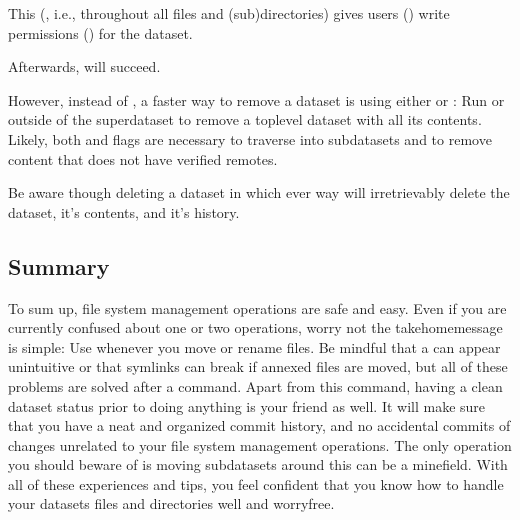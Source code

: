 \sphinxAtStartPar
This  (, i.e., throughout all files and (sub)directories) gives users
() write permissions () for the dataset.

\sphinxAtStartPar
Afterwards,  will succeed.

\sphinxAtStartPar
However, instead of , a faster way to remove a dataset is using either  or  : Run  or  outside of the
superdataset to remove a top\sphinxhyphen{}level dataset with all its contents. Likely,
both   and  flags are necessary
to traverse into subdatasets and to remove content that does not have verified remotes.

\sphinxAtStartPar
Be aware though deleting a dataset in which ever way will
irretrievably delete the dataset, it’s contents, and it’s history.


\subsection{Summary}
\label{\detokenize{basics/101-136-filesystem:summary}}
\sphinxAtStartPar
To sum up, file system management operations are safe and easy.
Even if you are currently confused about one or two operations,
worry not \textendash{} the take\sphinxhyphen{}home\sphinxhyphen{}message is simple: Use 
whenever you move or rename files. Be mindful that a 
can appear unintuitive or that symlinks can break if annexed files are moved,
but all of these problems are solved after a  command.
Apart from this command, having a clean dataset status prior to doing anything
is your friend as well. It will make sure that you have a neat and organized
commit history, and no accidental commits of changes unrelated to your file
system management operations. The only operation you should beware of is
moving subdatasets around \textendash{} this can be a minefield.
With all of these experiences and tips, you feel confident that you know
how to handle your datasets files and directories well and worry\sphinxhyphen{}free.

